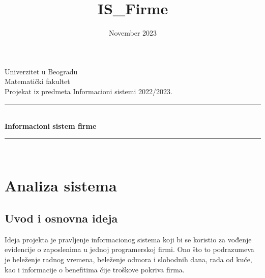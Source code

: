 \documentclass[a4paper]{article}
\title{IS_Firme}
\date{November 2023}
\begin{document}
\begin{titlepage}
    \centering

    \newcommand{\HRule}{\rule{\linewidth}{0.5mm}}
    \center
    \textup{\Large Univerzitet u Beogradu\\Matematički fakultet}\\[1.5cm]
    \textup{\Large Projekat iz predmeta Informacioni sistemi 2022/2023.}\\[0.4cm]

    \HRule \\[0.4cm]
    { \huge \bfseries Informacioni sistem firme}\\[0.4cm]
    \HRule \\[1.1cm]
\end{titlepage}

\newpage
\renewcommand\contentsname{Sadržaj:}
\tableofcontents

\newpage
\section{Analiza sistema}
\subsection{Uvod i osnovna ideja}
Ideja projekta je pravljenje informacionog sistema koji bi se koristio za vođenje evidencije o zaposlenima u jednoj programerskoj firmi. Ono što to podrazumeva je beleženje radnog vremena, beleženje odmora i slobodnih dana, rada od kuće, kao i informacije o benefitima čije troškove pokriva firma.
\end{document}
